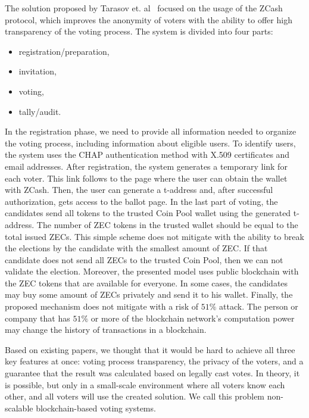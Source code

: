 \documentclass[applsci,article,submit,moreauthors,pdftex]{Definitions/mdpi}
\begin{document}
The solution proposed by Tarasov et. al~\cite{tarasov2017future} focused on the usage of the ZCash protocol, which improves the anonymity of voters with the ability to offer high transparency of the voting process. The system is divided into four parts:\begin{itemize}
    \item registration/preparation,
    \item invitation,
    \item voting,
    \item tally/audit.
\end{itemize}
In the registration phase, we need to provide all information needed to organize the voting process, including information about eligible users. To identify users, the system uses the CHAP authentication method with X.509 certificates and email addresses. After registration, the system generates a temporary link for each voter. This link follows to the page where the user can obtain the wallet with ZCash. Then, the user can generate a t-address and, after successful authorization, gets access to the ballot page. In the last part of voting, the candidates send all tokens to the trusted Coin Pool wallet using the generated t-address. The number of ZEC tokens in the trusted wallet should be equal to the total issued ZECs. This simple scheme does not mitigate with the ability to break the elections by the candidate with the smallest amount of ZEC. If that candidate does not send all ZECs to the trusted Coin Pool, then we can not validate the election. Moreover, the presented model uses public blockchain with the ZEC tokens that are available for everyone. In some cases, the candidates may buy some amount of ZECs privately and send it to his wallet. Finally, the proposed mechanism does not mitigate with a risk of $51\%$ attack. The person or company that has $51\%$ or more of the blockchain network's computation power may change the history of transactions in a blockchain.

Based on existing papers, we thought that it would be hard to achieve all three key features at once: voting process transparency, the privacy of the voters, and a guarantee that the result was calculated based on legally cast votes. In theory, it is possible, but only in a small-scale environment where all voters know each other, and all voters will use the created solution. We call this problem non-scalable blockchain-based voting systems. 
\end{document}
